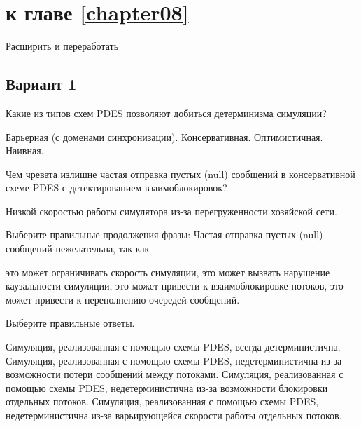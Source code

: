 \section{\Questions к главе \ref{chapter08}} %

\todo Расширить и переработать

\subsection*{Вариант 1}

\begin{questions}

\question[3] Какие из типов схем PDES позволяют добиться детерминизма симуляции?
\begin{choices}
    \correctchoice Барьерная (с доменами синхронизации).
    \choice Консервативная.
    \choice Оптимистичная.
    \choice Наивная.
\end{choices}

\question[3] Чем чревата излишне частая отправка пустых (null) сообщений в консервативной схеме PDES с детектированием взаимоблокировок?
\begin{solution}[1cm]
Низкой скоростью работы симулятора из-за перегруженности хозяйской сети.
\end{solution}

\question[3] Выберите правильные продолжения фразы: Частая отправка пустых (null)  сообщений нежелательна, так как
\begin{choices}
    \correctchoice это может ограничивать скорость симуляции,
    \choice это может вызвать нарушение каузальности симуляции,
    \choice это может привести к взаимоблокировке потоков,
    \choice это может привести к переполнению очередей сообщений.
\end{choices}

\question[3] Выберите правильные ответы.
\begin{choices}
    \choice    Симуляция, реализованная с помощью схемы PDES, всегда детерминистична.
    \choice Симуляция, реализованная с помощью схемы PDES, недетерминистична из-за возможности потери сообщений между потоками.
    \choice Симуляция, реализованная с помощью схемы PDES, недетерминистична из-за возможности блокировки отдельных потоков.
    \choice Симуляция, реализованная с помощью схемы PDES, недетерминистична из-за варьирующейся скорости работы отдельных потоков.
\end{choices}


\end{questions}


